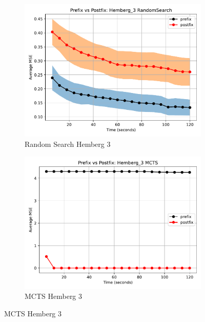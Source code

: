 \documentclass[runningheads]{llncs}
\begin{document}
\begin{figure}
    \centering
    
    \begin{subfigure}[b]{0.4\textwidth}
        \includegraphics[width=\linewidth, keepaspectratio]{Hemberg_Benchmarks/PrePostHemberg_3RandomSearch.pdf}
        \caption{Random Search Hemberg 3}
        \label{subfig:hemberg_3_RS}
    \end{subfigure}
    \begin{subfigure}[b]{0.4\textwidth}
        \includegraphics[width=\linewidth, keepaspectratio]{Hemberg_Benchmarks/PrePostHemberg_3MCTS.pdf}
        \caption{MCTS Hemberg 3}
        \label{subfig:hemberg_3_MCTS}
    \end{subfigure}
    

\end{figure}
\end{document}

